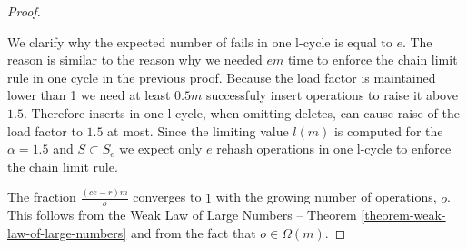 \begin{proof}
\begin{itemize}
We clarify why the expected number of fails in one l-cycle is equal to $e$. The reason is similar to the reason why we needed $em$ time to enforce the chain limit rule in one cycle in the previous proof. Because the load factor is maintained lower than 1 we need at least $0.5 m$ successfuly insert operations to raise it above $1.5$. Therefore inserts in one l-cycle, when omitting deletes, can cause raise of the load factor to $1.5$ at most. Since the limiting value $l(m)$ is computed for the $\alpha = 1.5$ and $S \subset S_e$ we expect only $e$ rehash operations in one l-cycle to enforce the chain limit rule.
\end{itemize}

The fraction $\frac{(ce - r)m}{o}$ converges to $1$ with the growing number of operations, $o$. This follows from the Weak Law of Large Numbers -- Theorem \ref{theorem-weak-law-of-large-numbers} and from the fact that $o \in \Omega(m)$.
\end{proof}

